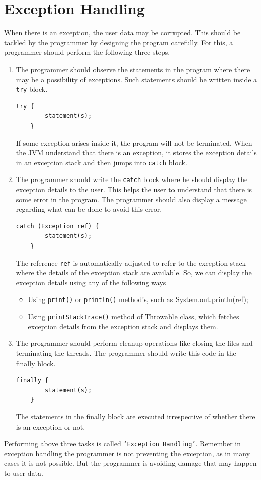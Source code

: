 \documentclass[11pt,a4paper]{article}
\begin{document}
\section*{Exception Handling}
When there is an exception, the user data may be corrupted. This should be tackled by the programmer by designing the program carefully. For this, a programmer should perform the following three steps.
\begin{enumerate}
\item The programmer should observe the statements in the program where there may be a possibility of exceptions. Such statements should be written inside a \texttt{try} block. 
\begin{lstlisting}[numbers=none]
    try {
        statement(s);
    }
\end{lstlisting}
If some exception arises inside it, the program will not be terminated. When the JVM understand that there is an exception, it stores the exception details in an exception stack and then jumps into \texttt{catch} block.

\item The programmer should write the \texttt{catch} block where he should display the exception details to the user. This helps the user to understand that there is some error in the program. The programmer should also display a message regarding what can be done to avoid this error. 
\begin{lstlisting}[numbers=none]
    catch (Exception ref) {
        statement(s);
    } 
\end{lstlisting}
The reference \texttt{ref} is automatically adjusted to refer to the exception stack where the details of the exception stack are available. So, we can display the exception details using any of the following ways
\begin{itemize}
\item Using \texttt{print()} or \texttt{println()} method's, such as System.out.println(ref);
\item Using \texttt{printStackTrace()} method of Throwable class, which fetches exception details from the exception stack and displays them.
\end{itemize}
\item The programmer should perform cleanup operations like closing the files and terminating the threads. The programmer should write this code in the finally block. 
\begin{lstlisting}[numbers=none]
    finally {
        statement(s);
    }
\end{lstlisting}
The statements in the finally block are executed irrespective of whether there is an exception or not.
\end{enumerate}
Performing above three tasks is called \texttt{`Exception Handling'}. Remember in exception handling the programmer is not preventing the exception, as in many cases it is not possible. But the programmer is avoiding damage that may happen to user data.
\end{document}
